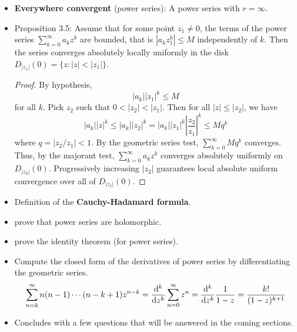 \documentclass[../notes.tex]{subfiles}
\begin{document}
\begin{itemize}
    \item \textbf{Everywhere convergent} (power series): A power series with $r=\infty$.
    \item Proposition 3.5: Assume that for some point $z_1\neq 0$, the terms of the power series $\sum_{k=0}^\infty a_kz^k$ are bounded, that is $|a_kz_1^k|\leq M$ independently of $k$. Then the series converges absolutely locally uniformly in the disk $D_{|z_1|}(0)=\{z:|z|<|z_1|\}$.
    \begin{proof}
        By hypothesis,
        \begin{equation*}
            |a_k||z_1|^k \leq M
        \end{equation*}
        for all $k$. Pick $z_2$ such that $0<|z_2|<|z_1|$. Then for all $|z|\leq|z_2|$, we have
        \begin{equation*}
            |a_k||z|^k \leq |a_k||z_2|^k
            = |a_k||z_1|^k\left| \frac{z_2}{z_1} \right|^k
            \leq Mq^k
        \end{equation*}
        where $q=|z_2/z_1|<1$. By the geometric series test, $\sum_{k=0}^\infty Mq^k$ converges. Thus, by the majorant test, $\sum_{k=0}^\infty a_kz^k$ converges absolutely uniformly on $D_{|z_2|}(0)$. Progressively increasing $|z_2|$ guarantees local absolute uniform convergence over all of $D_{|z_1|}(0)$.
    \end{proof}
    \item Definition of the \textbf{Cauchy-Hadamard formula}.
    \item \textcite{bib:FischerLieb} prove that power series are holomorphic.
    \item \textcite{bib:FischerLieb} prove the identity theorem (for power series).
    \item Compute the closed form of the derivatives of power series by differentiating the geometric series.
    \begin{equation*}
        \sum_{n=k}^\infty n(n-1)\cdots(n-k+1)z^{n-k} = \dv[k]{z}\sum_{n=0}^\infty z^n
        = \dv[k]{z}\frac{1}{1-z}
        = \frac{k!}{(1-z)^{k+1}}
    \end{equation*}
    \item Concludes with a few questions that will be answered in the coming sections.
\end{itemize}
\end{document}
